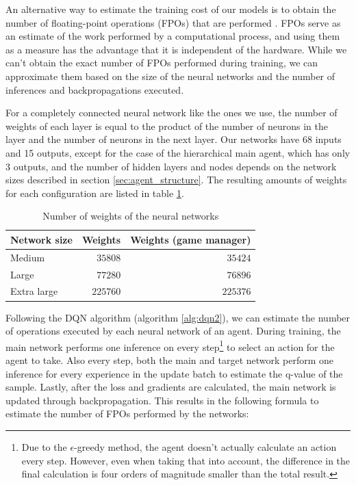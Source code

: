 An alternative way to estimate the training cost of our models is to obtain the number of floating-point operations (FPOs) that are performed \cite{Schwartz:2019}. FPOs serve as an estimate of the work performed by a computational process, and using them as a measure has the advantage that it is independent of the hardware. While we can't obtain the exact number of FPOs performed during training, we can approximate them based on the size of the neural networks and the number of inferences and backpropagations executed.

For a completely connected neural network like the ones we use, the number of weights of each layer is equal to the product of the number of neurons in the layer and the number of neurons in the next layer. Our networks have 68 inputs and 15 outputs, except for the case of the hierarchical main agent, which has only 3 outputs, and the number of hidden layers and nodes depends on the network sizes described in section \ref{sec:agent_structure}. The resulting amounts of weights for each configuration are listed in table \ref{tab:weights}.

\begin{table}[h]
    \centering
    \begin{tabular}{ l|r r }
        Network size & Weights & Weights (game manager) \\
        \hline
        Medium & $35808$ & $35424$ \\
        Large & $77280$ & $76896$ \\
        Extra large & $225760$ & $225376$ \\
    \end{tabular}
    \caption{Number of weights of the neural networks}
    \label{tab:weights}
\end{table}

Following the DQN algorithm (algorithm \ref{alg:dqn2}), we can estimate the number of operations executed by each neural network of an agent. During training, the main network performs one inference on every step\footnote{Due to the $\epsilon$-greedy method, the agent doesn't actually calculate an action every step. However, even when taking that into account, the difference in the final calculation is four orders of magnitude smaller than the total result.} to select an action for the agent to take. Also every step, both the main and target network perform one inference for every experience in the update batch to estimate the q-value of the sample. Lastly, after the loss and gradients are calculated, the main network is updated through backpropagation. This results in the following formula to estimate the number of FPOs performed by the networks:

